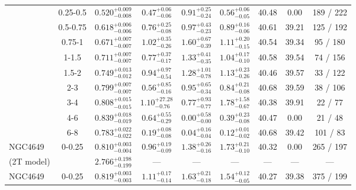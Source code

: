\documentclass[structabstract]{aa}
\begin{document}
{{\begin{longtable}{lcccccccc}
 & 0.25-0.5 & $ 0.520 _{- 0.008 }^{+ 0.009 } $ & $  0.47 _{-  0.06 }^{+  0.06 } $ & $  0.91 _{-  0.24 }^{+  0.25 } $ & $  0.56 _{-  0.05 }^{+  0.06 } $ &  40.48 & 0.00 &   189 /   222 \\
 & 0.5-0.75 & $ 0.618 _{- 0.006 }^{+ 0.006 } $ & $  0.76 _{-  0.08 }^{+  0.25 } $ & $  0.97 _{-  0.23 }^{+  0.43 } $ & $  0.89 _{-  0.06 }^{+  0.16 } $ &  40.61 & 39.21 &   125 /   192 \\
 & 0.75-1 & $ 0.671 _{- 0.007 }^{+ 0.007 } $ & $  1.02 _{-  0.26 }^{+  0.35 } $ & $  1.60 _{-  0.39 }^{+  0.67 } $ & $  1.11 _{-  0.15 }^{+  0.20 } $ &  40.54 & 39.34 &    95 /   180 \\
 & 1-1.5 & $ 0.711 _{- 0.007 }^{+ 0.007 } $ & $  0.77 _{-  0.17 }^{+  0.37 } $ & $  1.33 _{-  0.35 }^{+  0.41 } $ & $  1.04 _{-  0.10 }^{+  0.17 } $ &  40.58 & 39.54  &    74 /   156 \\
 & 1.5-2 & $ 0.749 _{- 0.012 }^{+ 0.013 } $ & $  0.94 _{-  0.54 }^{+  0.97 } $ & $  1.28 _{-  0.78 }^{+  1.01 } $ & $  1.13 _{-  0.26 }^{+  0.23 } $ &  40.46 & 39.57  &    33 /   122 \\
 & 2-3 & $ 0.799 _{- 0.007 }^{+ 0.007 } $ & $  0.56 _{-  0.16 }^{+  0.85 } $ & $  0.95 _{-  0.34 }^{+  0.65 } $ & $  0.84 _{-  0.08 }^{+  0.21 } $ &  40.68 & 39.59 &    38 /   106 \\
 & 3-4 & $ 0.808 _{- 0.015 }^{+ 0.015 } $ & $  1.10 _{-  0.76 }^{+ 27.28 } $ & $  0.77 _{-  0.77 }^{+  0.93 } $ & $  1.78 _{-  0.67 }^{+  1.58 } $ &  40.38 & 39.91 &    22 /    77 \\
 & 4-6 & $ 0.839 _{- 0.019 }^{+ 0.018 } $ & $  0.64 _{-  0.29 }^{+  0.55 } $ & $  0.00 _{-  0.00 }^{+  0.58 } $ & $  0.39 _{-  0.08 }^{+  0.23 } $ &  40.47 &  0.00 &    21 /    48 \\
 & 6-8 & $ 0.783 _{- 0.022 }^{+ 0.022 } $ & $  0.19 _{-  0.08 }^{+  0.08 } $ & $  0.04 _{-  0.04 }^{+  0.16 } $ & $  0.12 _{-  0.02 }^{+  0.01 } $ &  40.68 & 39.42 &   101 /    83 \\
\hline
NGC4649 & 0-0.25 & $ 0.810 _{- 0.004 }^{+ 0.003 } $ & $  0.96 _{-  0.09 }^{+  0.19 } $ & $  1.38 _{-  0.16 }^{+  0.26 } $ & $  1.73 _{-  0.10 }^{+  0.21 } $ &  40.32 & 0.00 &   265 /   197 \\
(2T model) & & $ 2.766 _{- 0.199 }^{+ 0.198 } $ & --- & --- & --- & --- & --- & --- \\
\hline
NGC4649 & 0-0.25 & $ 0.819 _{- 0.003 }^{+ 0.003 } $ & $  1.11 _{-  0.14 }^{+  0.17 } $ & $  1.63 _{-  0.18 }^{+  0.21 } $ & $  1.54 _{-  0.05 }^{+  0.12 } $ &  40.27 & 39.38 &   375 /   199 \\

\end{longtable}}}
\end{document}
